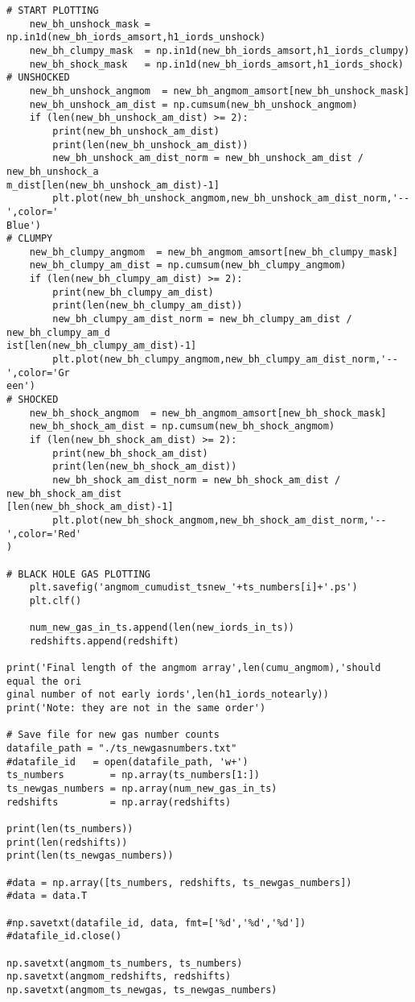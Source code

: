\documentclass[12pt,headA,chapB]{fiskthesis}
\begin{document}
\begin{verbatim}
# START PLOTTING
    new_bh_unshock_mask = np.in1d(new_bh_iords_amsort,h1_iords_unshock)
    new_bh_clumpy_mask  = np.in1d(new_bh_iords_amsort,h1_iords_clumpy)
    new_bh_shock_mask   = np.in1d(new_bh_iords_amsort,h1_iords_shock)
# UNSHOCKED
    new_bh_unshock_angmom  = new_bh_angmom_amsort[new_bh_unshock_mask]
    new_bh_unshock_am_dist = np.cumsum(new_bh_unshock_angmom)
    if (len(new_bh_unshock_am_dist) >= 2):
        print(new_bh_unshock_am_dist)
        print(len(new_bh_unshock_am_dist))
        new_bh_unshock_am_dist_norm = new_bh_unshock_am_dist / new_bh_unshock_a
m_dist[len(new_bh_unshock_am_dist)-1]
        plt.plot(new_bh_unshock_angmom,new_bh_unshock_am_dist_norm,'--',color='
Blue')
# CLUMPY
    new_bh_clumpy_angmom  = new_bh_angmom_amsort[new_bh_clumpy_mask]
    new_bh_clumpy_am_dist = np.cumsum(new_bh_clumpy_angmom)
    if (len(new_bh_clumpy_am_dist) >= 2):
        print(new_bh_clumpy_am_dist)
        print(len(new_bh_clumpy_am_dist))
        new_bh_clumpy_am_dist_norm = new_bh_clumpy_am_dist / new_bh_clumpy_am_d
ist[len(new_bh_clumpy_am_dist)-1]
        plt.plot(new_bh_clumpy_angmom,new_bh_clumpy_am_dist_norm,'--',color='Gr
een')
# SHOCKED
    new_bh_shock_angmom  = new_bh_angmom_amsort[new_bh_shock_mask]
    new_bh_shock_am_dist = np.cumsum(new_bh_shock_angmom)
    if (len(new_bh_shock_am_dist) >= 2):
        print(new_bh_shock_am_dist)
        print(len(new_bh_shock_am_dist))
        new_bh_shock_am_dist_norm = new_bh_shock_am_dist / new_bh_shock_am_dist
[len(new_bh_shock_am_dist)-1]
        plt.plot(new_bh_shock_angmom,new_bh_shock_am_dist_norm,'--',color='Red'
)

# BLACK HOLE GAS PLOTTING
    plt.savefig('angmom_cumudist_tsnew_'+ts_numbers[i]+'.ps')
    plt.clf()

    num_new_gas_in_ts.append(len(new_iords_in_ts))
    redshifts.append(redshift)

print('Final length of the angmom array',len(cumu_angmom),'should equal the ori
ginal number of not early iords',len(h1_iords_notearly))
print('Note: they are not in the same order')

# Save file for new gas number counts
datafile_path = "./ts_newgasnumbers.txt"
#datafile_id   = open(datafile_path, 'w+')
ts_numbers        = np.array(ts_numbers[1:])
ts_newgas_numbers = np.array(num_new_gas_in_ts)
redshifts         = np.array(redshifts)

print(len(ts_numbers))
print(len(redshifts))
print(len(ts_newgas_numbers))

#data = np.array([ts_numbers, redshifts, ts_newgas_numbers])
#data = data.T

#np.savetxt(datafile_id, data, fmt=['%d','%d','%d'])
#datafile_id.close()

np.savetxt(angmom_ts_numbers, ts_numbers)
np.savetxt(angmom_redshifts, redshifts)
np.savetxt(angmom_ts_newgas, ts_newgas_numbers)
\end{verbatim}
\end{document}

